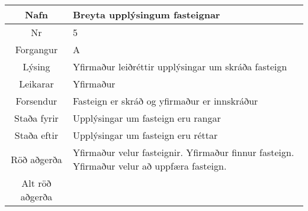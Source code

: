 \documentclass[a4paper]{article}
\begin{document}
\begin{tabular}{|c|p{10cm}|}
\hline
Nafn&Breyta upplýsingum fasteignar\\
\hline
Nr&5\\
\hline
Forgangur&A\\
\hline
Lýsing&Yfirmaður leiðréttir upplýsingar um skráða fasteign\\
\hline
Leikarar&Yfirmaður\\
\hline
Forsendur&Fasteign er skráð og yfirmaður er innskráður\\
\hline
Staða fyrir&Upplýsingar um fasteign eru rangar\\
\hline
Staða eftir&Upplýsingar um fasteign eru réttar\\
\hline
Röð aðgerða&Yfirmaður velur fasteignir. Yfirmaður finnur fasteign. Yfirmaður velur að uppfæra fasteign.\\
\hline
Alt röð aðgerða&\\
\hline
\end{tabular}
\end{document}
